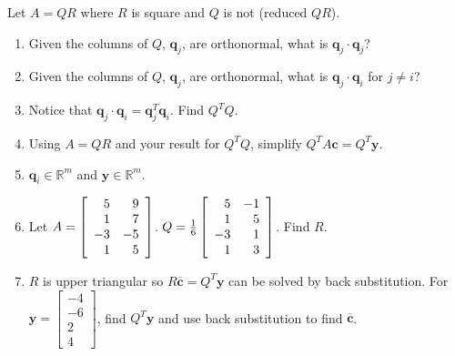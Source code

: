 \documentclass[12pt,letterpaper,noanswers]{exam}
\begin{document}
Let $A = QR$ where $R$ is square and $Q$ is not (reduced $QR$).

\begin{enumerate}
\itemsep60pt
  \item  Given the columns of $Q$, $\mathbf{q}_j$, are orthonormal, what is $\mathbf{q}_j\cdot \mathbf{q}_j$?
    \item  Given the columns of $Q$, $\mathbf{q}_j$, are orthonormal, what is $\mathbf{q}_j\cdot \mathbf{q}_i$ for $j\neq i$?
    \item Notice that $\mathbf{q}_j\cdot \mathbf{q}_i = \mathbf{q}_j^T\mathbf{q}_i$.  Find $Q^TQ$.
    \item Using $A = QR$ and your result for $Q^TQ$, simplify $Q^TA\mathbf{c} = Q^T \mathbf{y}$.

\item $\mathbf{q}_i \in \mathbb{R}^m$ and $\mathbf{y}\in\mathbb{R}^m$.  
    
    \item Let $A =\left[ \begin{array}{r r} 5 & 9 \\ 1 & 7 \\ -3 & -5 \\ 1 & 5\end{array}\right]$.  $Q =\frac{1}{6}\left[ \begin{array}{r r} 5 & -1 \\ 1 & 5 \\ -3 & 1 \\ 1 & 3\end{array}\right]$.  Find $R$.
    
    \item $R$ is upper triangular so $R\overline{\mathbf{c}} = Q^T\mathbf{y}$ can be solved by back substitution.  For $\mathbf{y} = \left[\begin{array}{r} -4 \\ -6 \\ 2 \\ 4  \end{array}\right]$, find $Q^T\mathbf{y}$ and use back substitution to find $\overline{\mathbf{c}}$.
\end{enumerate}
\vspace{2in}
\end{document}
